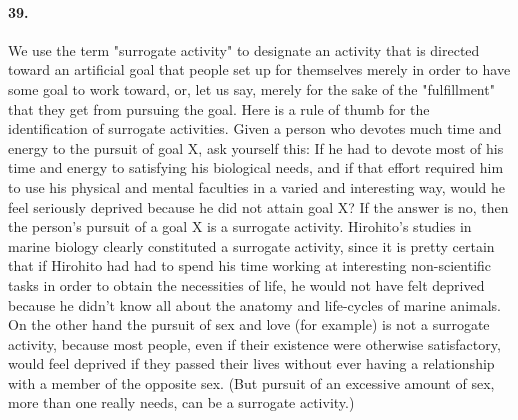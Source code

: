 \documentclass[12pt]{book}
\begin{document}
\paragraph{39.} We use the term "surrogate activity" to designate an activity that is directed toward an artificial goal that people set up for themselves merely in order to have some goal to work toward, or, let us say, merely for the sake of the "fulfillment" that they get from pursuing the goal. Here is a rule of thumb for the identification of surrogate activities. Given a person who devotes much time and energy to the pursuit of goal X, ask yourself this: If he had to devote most of his time and energy to satisfying his biological needs, and if that effort required him to use his physical and mental faculties in a varied and interesting way, would he feel seriously deprived because he did not attain goal X? If the answer is no, then the person's pursuit of a goal X is a surrogate activity. Hirohito's studies in marine biology clearly constituted a surrogate activity, since it is pretty certain that if Hirohito had had to spend his time working at interesting non-scientific tasks in order to obtain the necessities of life, he would not have felt deprived because he didn't know all about the anatomy and life-cycles of marine animals. On the other hand the pursuit of sex and love (for example) is not a surrogate activity, because most people, even if their existence were otherwise satisfactory, would feel deprived if they passed their lives without ever having a relationship with a member of the opposite sex. (But pursuit of an excessive amount of sex, more than one really needs, can be a surrogate activity.)
\end{document}

